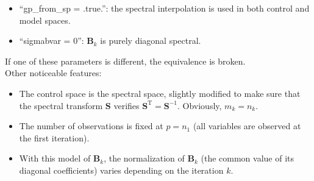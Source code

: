\documentclass[12pt]{scrartcl}
\begin{document}
\begin{itemize}
\item ``gp\_from\_sp = .true.'': the spectral interpolation is used in both control and model spaces.
\item ``sigmabvar = 0'': $\mathbf{B}_k$ is purely diagonal spectral.
\end{itemize}
If one of these parameters is different, the equivalence is broken.\\
$  $\\
Other noticeable features:
\begin{itemize}
\item The control space is the spectral space, slightly modified to make sure that the spectral transform $\mathbf{S}$ verifies $\mathbf{S}^\mathrm{T} = \mathbf{S}^{-1}$. Obviously, $m_k = n_k$.
\item The number of observations is fixed at $p = n_1$ (all variables are observed at the first iteration).
\item With this model of $\mathbf{B}_k$, the normalization of $\mathbf{B}_k$ (the common value of its diagonal coefficients) varies depending on the iteration $k$.
\end{itemize}



\end{document}

